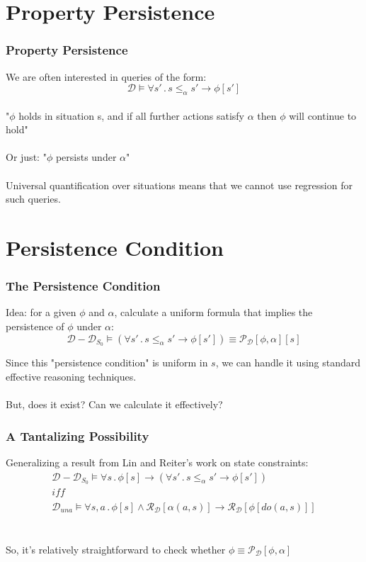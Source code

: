 \documentclass[compress]{beamer}
\begin{document}
\section{Property Persistence}

\begin{frame}
\frametitle{Property Persistence}
We are often interested in queries of the form:
\begin{equation*}
\mathcal{D} \models \forall s'\,.\,s \leq_{\alpha} s' \rightarrow \phi[s']
\end{equation*}
\ \\
"$\phi$ holds in situation s, and if all further actions satisfy $\alpha$ then $\phi$ will continue to hold"
\ \\
\ \\
Or just: "$\phi$ persists under $\alpha$"
\ \\
\ \\
Universal quantification over situations means that we cannot use regression
for such queries.
\end{frame}

\section{Persistence Condition}

\begin{frame}
\frametitle{The Persistence Condition}
Idea: for a given $\phi$ and $\alpha$, calculate a uniform formula that implies the persistence of $\phi$ under $\alpha$:
\begin{equation*}
  \mathcal{D}-\mathcal{D}_{S_0} \models \left(\forall s'\,.\,s \leq_{\alpha} s' \rightarrow \phi[s']\right) \equiv \mathcal{P}_{\mathcal{D}}[\phi,\alpha][s]
\end{equation*}

Since this "persistence condition" is uniform in $s$, we can handle it using
standard effective reasoning techniques.
\ \\
\ \\
But, does it exist? Can we calculate it effectively?
\end{frame}

\begin{frame}
\frametitle{A Tantalizing Possibility}
Generalizing a result from Lin and Reiter's work on state constraints:
\begin{gather*}
\mathcal{D}-\mathcal{D}_{S_{0}}\models\forall s\,.\,\phi[s]\rightarrow\left(\forall s'\,.\, s\leq_{\alpha}s'\rightarrow\phi[s']\right)\\
\mathit{iff}\\
\mathcal{D}_{una}\models\forall s,a\,.\,\phi[s]\wedge\mathcal{R}_{\mathcal{D}}[\alpha(a,s)]\rightarrow\mathcal{R}_{\mathcal{D}}[\phi[do(a,s)]]
\end{gather*}
\ \\
\ \\
So, it's relatively straightforward to check whether $\phi \equiv \mathcal{P}_{\mathcal{D}}[\phi,\alpha]$
\end{frame}
\end{document}
